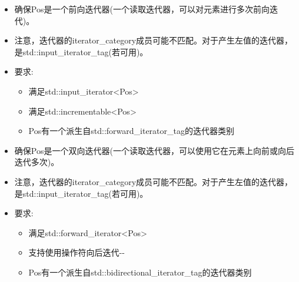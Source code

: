 
\begin{itemize}
\item
确保Pos是一个前向迭代器(一个读取迭代器，可以对元素进行多次前向迭代)。

\item
注意，迭代器的iterator\_category成员可能不匹配。对于产生左值的迭代器，是std::input\_iterator\_tag(若可用)。

\item
要求:
\begin{itemize}
\item
满足std::input\_iterator<Pos>

\item
满足std::incrementable<Pos>

\item
Pos有一个派生自std::forward\_iterator\_tag的迭代器类别
\end{itemize}
\end{itemize}


\begin{itemize}
\item
确保Pos是一个双向迭代器(一个读取迭代器，可以使用它在元素上向前或向后迭代多次)。

\item
注意，迭代器的iterator\_category成员可能不匹配。对于产生左值的迭代器，是std::input\_iterator\_tag(若可用)。

\item
要求:
\begin{itemize}
\item
满足std::forward\_iterator<Pos>

\item
支持使用操作符向后迭代-{}-

\item
Pos有一个派生自std::bidirectional\_iterator\_tag的迭代器类别
\end{itemize}
\end{itemize}


